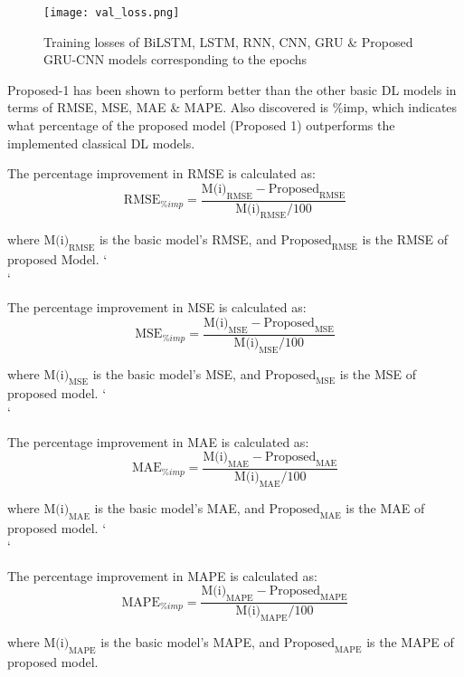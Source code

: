   \begin{figure*}[h!]
   \centering
   \texttt{[image: val\_loss.png]}
    \caption{Training losses of BiLSTM, LSTM, RNN, CNN, GRU \& Proposed GRU-CNN models corresponding to the epochs}
    \label{Fig:12}
  \end{figure*}



Proposed-1 has been shown to perform better than the other basic DL models in terms of RMSE, MSE, MAE \& MAPE.  Also discovered is \%imp, which indicates what percentage of the proposed model (Proposed 1) outperforms the implemented classical DL models.


The percentage improvement in RMSE is calculated as:
\begin{equation}
    \text{RMSE}_{\%imp} = \frac{\text{M(i)}_{\text{RMSE}} - \text{Proposed}_{\text{RMSE}}}{\text{M(i)}_{\text{RMSE}}/100}
\end{equation}

where $\text{M(i)}_{\text{RMSE}}$ is the basic model's RMSE,  and $\text{Proposed}_{\text{RMSE}}$ is the RMSE of proposed Model. `\\`

The percentage improvement in MSE is calculated as:
\begin{equation}
    \text{MSE}_{\%imp} = \frac{\text{M(i)}_{\text{MSE}} - \text{Proposed}_{\text{MSE}}}{\text{M(i)}_{\text{MSE}}/100}
\end{equation}

where $\text{M(i)}_{\text{MSE}}$ is the basic model's MSE,  and $\text{Proposed}_{\text{MSE}}$ is the MSE of proposed model. `\\`

The percentage improvement in MAE is calculated as:
\begin{equation}
    \text{MAE}_{\%imp} = \frac{\text{M(i)}_{\text{MAE}} - \text{Proposed}_{\text{MAE}}}{\text{M(i)}_{\text{MAE}}/100}
\end{equation}

where $\text{M(i)}_{\text{MAE}}$ is the basic model's MAE,  and $\text{Proposed}_{\text{MAE}}$ is the MAE of proposed model. `\\`

The percentage improvement in MAPE is calculated as:
\begin{equation}
   \text{MAPE}_{\%imp} = \frac{\text{M(i)}_{\text{MAPE}} - \text{Proposed}_{\text{MAPE}}}{\text{M(i)}_{\text{MAPE}}/100}
\end{equation}

where $\text{M(i)}_{\text{MAPE}}$ is the basic model's MAPE,  and $\text{Proposed}_{\text{MAPE}}$ is the MAPE of proposed model.





